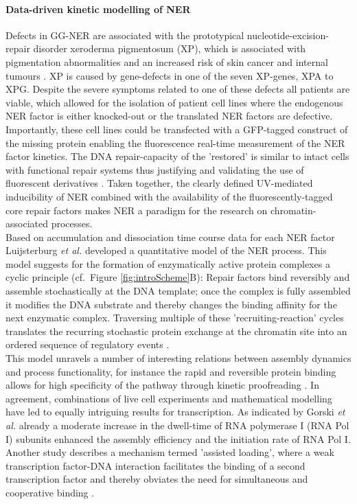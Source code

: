 \paragraph{Data-driven kinetic modelling of NER}
Defects in GG-NER are associated with the prototypical nucleotide-excision-repair disorder xeroderma pigmentosum (XP), which is associated with pigmentation abnormalities and an increased risk of skin cancer and internal tumours \cite{Hoeijmakers2009}. XP is caused by gene-defects in one of the seven XP-genes, XPA to XPG. Despite the severe symptoms related to one of these defects all patients are viable, which allowed for the isolation of patient cell lines where the endogenous NER factor is either knocked-out or the translated NER factors are defective. Importantly, these cell lines could be transfected with a GFP-tagged construct of the missing protein enabling the fluorescence real-time measurement of the NER factor kinetics. The DNA repair-capacity of the 'restored' is similar to intact cells with functional repair systems thus justifying and validating the use of fluorescent derivatives \cite{Hoogstraten2002,Hoogstraten2008,Zotter2006,Rademakers2003}. Taken together, the clearly defined UV-mediated inducibility of NER combined with the availability of the fluorescently-tagged core repair factors makes NER a paradigm for the research on chromatin-associated processes.\\
Based on accumulation and dissociation time course data for each NER factor Luijsterburg \textit{et al.}\cite{Luijsterburg2010} developed a quantitative model of the NER process. This model suggests for the formation of enzymatically active protein complexes a cyclic principle (cf.\ Figure \ref{fig:introScheme}B): Repair factors bind reversibly and assemble stochastically at the DNA template; once the complex is fully assembled it modifies the DNA substrate and thereby changes the binding affinity for the next enzymatic complex. Traversing multiple of these 'recruiting-reaction' cycles translates the recurring stochastic protein exchange at the chromatin site into an ordered sequence of regulatory events \cite{Dinant:2009:J-Cell-Biol:19332890}.\\
\label{sec:RNA_pol}
This model unravels a number of interesting relations between assembly dynamics and process functionality, for instance the rapid and reversible protein binding allows for high specificity of the pathway through kinetic proofreading \cite{Luijsterburg2010}. In agreement, combinations of live cell experiments and mathematical modelling have led to equally intriguing results for transcription. As indicated by Gorski \textit{et al.} \cite{Gorski:2008:Mol-Cell:18498750} already a moderate increase in the dwell-time of RNA polymerase I (RNA Pol I) subunits enhanced the assembly efficiency and the initiation rate of RNA Pol I. Another study describes a mechanism termed 'assisted loading', where a weak transcription factor-DNA interaction facilitates the binding of a second transcription factor and thereby obviates the need for simultaneous and cooperative binding \cite{Voss2011}. \\         
